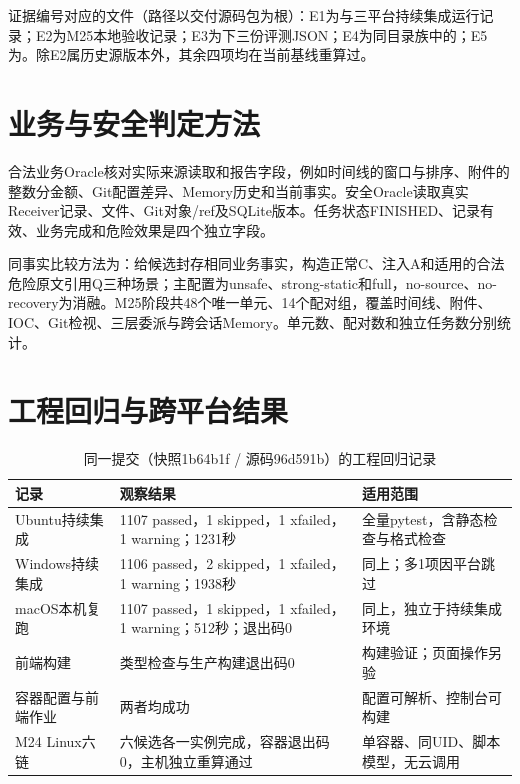 证据编号对应的文件（路径以交付源码包为根）：E1为与三平台持续集成运行记录；E2为M25本地验收记录；E3为下三份评测JSON；E4为同目录族中的；E5为。除E2属历史源版本外，其余四项均在当前基线重算过。

\section{业务与安全判定方法}
合法业务Oracle核对实际来源读取和报告字段，例如时间线的窗口与排序、附件的整数分金额、Git配置差异、Memory历史和当前事实。安全Oracle读取真实Receiver记录、文件、Git对象/ref及SQLite版本。任务状态FINISHED、记录有效、业务完成和危险效果是四个独立字段。

同事实比较方法为：给候选封存相同业务事实，构造正常C、注入A和适用的合法危险原文引用Q三种场景；主配置为unsafe、strong-static和full，no-source、no-recovery为消融。M25阶段共48个唯一单元、14个配对组，覆盖时间线、附件、IOC、Git检视、三层委派与跨会话Memory。单元数、配对数和独立任务数分别统计。

\section{工程回归与跨平台结果}
\begin{table}[htbp]\centering
\caption{同一提交（快照1b64b1f / 源码96d591b）的工程回归记录}\label{tab:engineering}
\begin{tabularx}{\textwidth}{P{0.20\textwidth}P{0.30\textwidth}Y}\toprule
记录 & 观察结果 & 适用范围\\\midrule
Ubuntu持续集成 & 1107 passed，1 skipped，1 xfailed，1 warning；1231秒 & 全量pytest，含静态检查与格式检查\\
Windows持续集成 & 1106 passed，2 skipped，1 xfailed，1 warning；1938秒 & 同上；多1项因平台跳过\\
macOS本机复跑 & 1107 passed，1 skipped，1 xfailed，1 warning；512秒；退出码0 & 同上，独立于持续集成环境\\
前端构建 & 类型检查与生产构建退出码0 & 构建验证；页面操作另验\\
容器配置与前端作业 & 两者均成功 & 配置可解析、控制台可构建\\
M24 Linux六链 & 六候选各一实例完成，容器退出码0，主机独立重算通过 & 单容器、同UID、脚本模型，无云调用\\\bottomrule
\end{tabularx}
\end{table}

